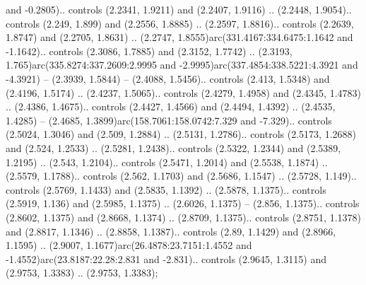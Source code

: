 and -0.2805).. controls (2.2341, 1.9211) and (2.2407, 1.9116) .. (2.2448, 1.9054).. controls (2.249, 1.899) and (2.2556, 1.8885) .. (2.2597, 1.8816).. controls (2.2639, 1.8747) and (2.2705, 1.8631) .. (2.2747, 1.8555)arc(331.4167:334.6475:1.1642 and -1.1642).. controls (2.3086, 1.7885) and (2.3152, 1.7742) .. (2.3193, 1.765)arc(335.8274:337.2609:2.9995 and -2.9995)arc(337.4854:338.5221:4.3921 and -4.3921) -- (2.3939, 1.5844) -- (2.4088, 1.5456).. controls (2.413, 1.5348) and (2.4196, 1.5174) .. (2.4237, 1.5065).. controls (2.4279, 1.4958) and (2.4345, 1.4783) .. (2.4386, 1.4675).. controls (2.4427, 1.4566) and (2.4494, 1.4392) .. (2.4535, 1.4285) -- (2.4685, 1.3899)arc(158.7061:158.0742:7.329 and -7.329).. controls (2.5024, 1.3046) and (2.509, 1.2884) .. (2.5131, 1.2786).. controls (2.5173, 1.2688) and (2.524, 1.2533) .. (2.5281, 1.2438).. controls (2.5322, 1.2344) and (2.5389, 1.2195) .. (2.543, 1.2104).. controls (2.5471, 1.2014) and (2.5538, 1.1874) .. (2.5579, 1.1788).. controls (2.562, 1.1703) and (2.5686, 1.1547) .. (2.5728, 1.149).. controls (2.5769, 1.1433) and (2.5835, 1.1392) .. (2.5878, 1.1375).. controls (2.5919, 1.136) and (2.5985, 1.1375) .. (2.6026, 1.1375) -- (2.856, 1.1375).. controls (2.8602, 1.1375) and (2.8668, 1.1374) .. (2.8709, 1.1375).. controls (2.8751, 1.1378) and (2.8817, 1.1346) .. (2.8858, 1.1387).. controls (2.89, 1.1429) and (2.8966, 1.1595) .. (2.9007, 1.1677)arc(26.4878:23.7151:1.4552 and -1.4552)arc(23.8187:22.28:2.831 and -2.831).. controls (2.9645, 1.3115) and (2.9753, 1.3383) .. (2.9753, 1.3383);



